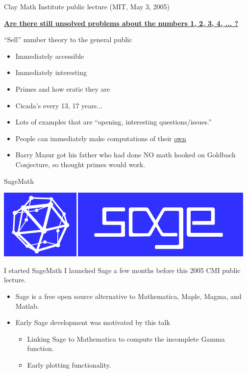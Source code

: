\documentclass{beamer}
\begin{document}
\begin{frame}{Clay Math Institute public lecture (MIT, May 3, 2005)}

  \href{http://www.claymath.org/library/public\_lectures/mazur\_riemann\_hypothesis.pdf}{\bf Are there still unsolved problems about the numbers 1, 2, 3, 4, ... ?}
  \vfill

  \begin{block}{``Sell'' number theory to the general public}
    \begin{itemize}
      \item   Immediately accessible
      \item   Immediately interesting
      \item   Primes and how eratic they are
      \item   Cicada's every 13, 17 years...
      \item   Lots of examples that are ``opening, interesting questions/issues.''
      \item   People can immediately make computations of their \underline{own}
      \item   Barry Mazur got his father who had done NO
            math hooked on Goldbach Conjecture, so thought
            primes would work.
    \end{itemize}
  \end{block}
\end{frame}

\begin{frame}{SageMath}
  \vfill
  \begin{center}
    \includegraphics[width=.7\textwidth]{pics/sage-logo.png}
  \end{center}
  \vfill

  \begin{block}{I started SageMath}
    I launched Sage a few months before this 2005 CMI public lecture.
    \begin{itemize}
      \item Sage is a free open source alternative to Mathematica, Maple, Magma, and Matlab.
      \item Early Sage development was motivated by this talk
            \begin{itemize}
              \item Linking Sage to Mathematica to compute the incomplete Gamma function.
              \item Early plotting functionality.
            \end{itemize}
    \end{itemize}
  \end{block}
\end{frame}
\end{document}
